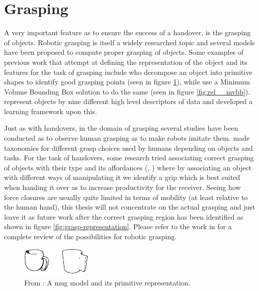 \section{Grasping}
A very important feature as to ensure the success of a handover, is the grasping of objects. Robotic grasping is itself a widely researched topic and several models have been proposed to compute proper grasping of objects. Some examples of previous work that attempt at defining the representation of the object and its features for the task of grasping include \textcite{Miller2003} who decompose an object into primitive shapes to identify good grasping points (seen in figure \ref{fig:rel__shape-primitives}), while \textcite{Huebner2008} use a Minimum Volume Bounding Box solution to do the same (seen in figure \ref{fig:rel__mvbb}). \textcite{Morales} represent objects by nine different high level descriptors of data and developed a learning framework upon this.

Just as with handovers, in the domain of grasping several studies have been conducted as to observe human grasping as to make robots imitate them. \parencite{Cutkosky1990} \parencite{Feix2009} \parencite{Kang1993} made taxonomies for different grasp choices used by humans depending on objects and tasks. For the task of handovers, some research tried associating correct grasping of objects with their type and its affordances (\parencite{Song2015}, \parencite{Chan2014}) where by associating an object with different ways of manipulating it we identify a grip which is best suited when handing it over as to increase productivity for the receiver. Seeing how force closures are usually quite limited in terms of mobility (at least relative to the human hand), this thesis will not concentrate on the actual grasping and just leave it as future work after the correct grasping region has been identified as shown in figure \ref{fig:grasp-representation}. Please refer to the work in \parencite{Sahbani2012} for a complete review of the possibilities for robotic grasping.

\begin{figure}
	\centering
	\includegraphics[width=0.3\textwidth]{img/related-work/shape-primitives.png}
	\caption{From \parencite{Miller2003}: A mug model and its primitive representation.}
	\label{fig:rel__shape-primitives}
\end{figure}

